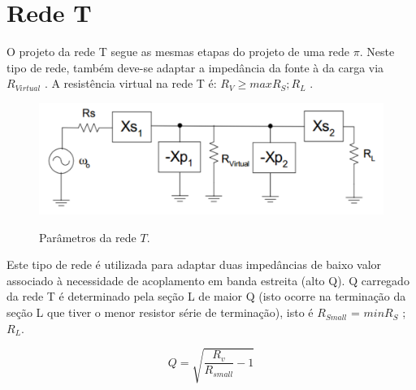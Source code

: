 \section{Rede T}

O projeto da rede T segue as mesmas etapas do projeto de uma rede $\pi$. Neste tipo de rede,
também deve-se adaptar a impedância da fonte à da carga via $R_{Virtual}$ . A resistência virtual
na rede T é: $R_V \ge  maxR_S ; R_L$ .

\begin{figure}[H]
    \centering
    \caption{Parâmetros da rede $T$.}
    \includegraphics[scale=0.3]{Imagens/fig4.png}
    \label{f_fig4}
\end{figure}


Este tipo de rede é utilizada para adaptar duas impedâncias de baixo valor associado à
necessidade de acoplamento em banda estreita (alto Q).
Q carregado da rede T é determinado pela seção L de maior Q (isto ocorre na terminação
da seção L que tiver o menor resistor série de terminação), isto é $R_{Small}$ = $minR_S$ ; $R_L$.

\begin{equation}
Q = \sqrt{\frac{R_v}{R_{small}} -1 }
\end{equation}
